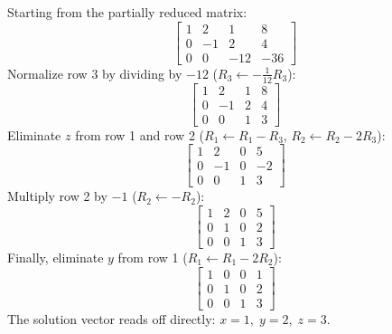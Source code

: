 \begin{examplebox}
Starting from the partially reduced matrix:
\begin{equation}
    \left[\begin{array}{ccc|c}
    1 & 2 & 1 & 8 \\
    0 & -1 & 2 & 4 \\
    0 & 0 & -12 & -36
    \end{array}\right]
\end{equation}
Normalize row 3 by dividing by $-12$ ($R_3 \leftarrow -\frac{1}{12} R_3$):
\begin{equation}
    \left[\begin{array}{ccc|c}
    1 & 2 & 1 & 8 \\
    0 & -1 & 2 & 4 \\
    0 & 0 & 1 & 3
    \end{array}\right]
\end{equation}
Eliminate $z$ from row 1 and row 2 ($R_1 \leftarrow R_1 - R_3$, $R_2 \leftarrow R_2 - 2R_3$):
\begin{equation}
    \left[\begin{array}{ccc|c}
    1 & 2 & 0 & 5 \\
    0 & -1 & 0 & -2 \\
    0 & 0 & 1 & 3
    \end{array}\right]
\end{equation}
Multiply row 2 by $-1$ ($R_2 \leftarrow -R_2$):
\begin{equation}
    \left[\begin{array}{ccc|c}
    1 & 2 & 0 & 5 \\
    0 & 1 & 0 & 2 \\
    0 & 0 & 1 & 3
    \end{array}\right]
\end{equation}
Finally, eliminate $y$ from row 1 ($R_1 \leftarrow R_1 - 2R_2$):
\begin{equation}
    \left[\begin{array}{ccc|c}
    1 & 0 & 0 & 1 \\
    0 & 1 & 0 & 2 \\
    0 & 0 & 1 & 3
    \end{array}\right]
\end{equation}
The solution vector reads off directly: $\boxed{x = 1, \; y = 2, \; z = 3}$.
\end{examplebox}

